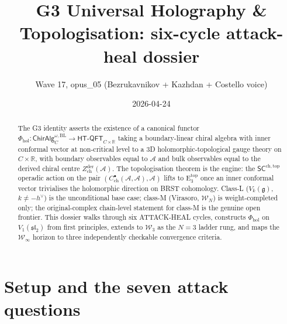 \documentclass{article}
\theoremstyle{definition}
\theoremstyle{remark}
\newcommand{\SCchtop}{\mathsf{SC}^{\mathrm{ch,top}}}
\newcommand{\Phihol}{\Phi_{\mathrm{hol}}}
\newcommand{\HTQFT}{\mathsf{HT\text{-}QFT}}
\newcommand{\ChirAlg}{\mathsf{ChirAlg}}
\newcommand{\Zder}{Z^{\mathrm{der}}_{\mathrm{ch}}}
\newcommand{\Etop}[1]{\mathrm{E}_{#1}^{\mathrm{top}}}
\newcommand{\fg}{\mathfrak{g}}
\newcommand{\cW}{\mathcal{W}}
\newcommand{\cA}{\mathcal{A}}
\begin{document}
\title{G3 Universal Holography \& Topologisation: six-cycle attack-heal dossier}
\author{Wave 17, opus\_05 (Bezrukavnikov + Kazhdan + Costello voice)}
\date{2026-04-24}
\maketitle

\begin{abstract}
The G3 identity asserts the existence of a canonical functor
$\Phihol\colon \ChirAlg^{\omega,\mathrm{BL}}_C \to
\HTQFT_{C\times\mathbb{R}}$ taking a boundary-linear chiral algebra
with inner conformal vector at non-critical level to a 3D
holomorphic-topological gauge theory on $C\times\mathbb{R}$, with
boundary observables equal to $\cA$ and bulk observables equal to
the derived chiral centre $\Zder(\cA)$. The topologisation theorem
is the engine: the $\SCchtop$ operadic action on the pair
$(C^{\bullet}_{\mathrm{ch}}(\cA,\cA),\cA)$ lifts to
$\Etop{3}$ once an inner conformal vector trivialises the
holomorphic direction on BRST cohomology. Class-L ($V_k(\fg)$,
$k\neq -h^\vee$) is the unconditional base case; class-M
(Virasoro, $\cW_N$) is weight-completed only; the original-complex
chain-level statement for class-M is the genuine open frontier.
This dossier walks through six ATTACK-HEAL cycles, constructs
$\Phihol$ on $V_1(\mathfrak{sl}_2)$ from first principles, extends
to $\cW_3$ as the $N=3$ ladder rung, and maps the $\cW_\infty$
horizon to three independently checkable convergence criteria.
\end{abstract}

\tableofcontents

\section{Setup and the seven attack questions}
\label{sec:opus-setup}
\end{document}
